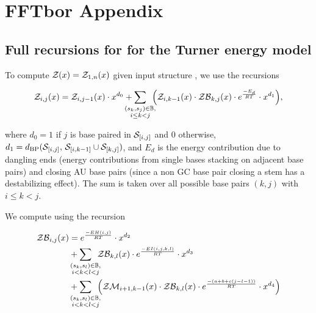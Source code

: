 
\chapter{FFTbor Appendix}
\label{ch:fftborapp}


\section{Full recursions for \texorpdfstring{}{}
for the Turner energy model}
\label{sec:fftbor:turner}

To compute ${\mathcal Z}_{}(x) = {\mathcal Z}_{1,n}(x)$ given input structure \str, we use the recursions

\begin{align}
\label{eq:fftborapp:zx}
\emZ{i,j} = \emZ{i,j-1} \cdot x^{d_0} +
\sum_{\mathclap{\substack{(s_k,s_j) \in \bpSet, \\ i \leq k < j}}}\enspace
\Big( \emZ{i,k-1} \cdot \emZB{k,j} \cdot \boltzE{E_d} \cdot x^{d_1} \Big),
\end{align}

where $d_0 = 1$ if $j$ is base paired
in $\mathcal S_{[i,j]}$ and $0$ otherwise, $d_1 =
d_{\text{BP}}(\mathcal S_{[i,j]},\,\mathcal S_{[i,k-1]} \cup \mathcal S_{[k,j]})$, and $E_d$
is the energy contribution due to dangling ends (energy
contributions from single bases stacking on adjacent base pairs) and
closing AU base pairs (since a non GC base pair closing a stem has a
destabilizing effect).  The sum is taken over all possible
base pairs $(k,j)$ with $i \leq k < j$.

We compute \emZB{} using the recursion

\begin{align}
\label{eq:fftborapp:zbx}
\begin{split}
\emZB{i,j} &= \boltzE{EH(i,j)} \cdot x^{d_2} \\
&+ \sum_{\mathclap{\substack{(s_k,s_l) \in \bpSet, \\ i < k < l < j }}}\enspace
\emZB{k,l} \cdot \boltzE{EI(i,j,k,l)} \cdot x^{d_3} \\
&+ \sum_{\mathclap{\substack{(s_k,s_l) \in \bpSet, \\ i < k < l < j }}}\enspace
\Big( \emZM{i+1,k-1} \cdot \emZB{k,l} \cdot \boltzE{(a+b+c(j-l-1))}
\cdot x^{d_4} \Big)
\end{split}
\end{align}

